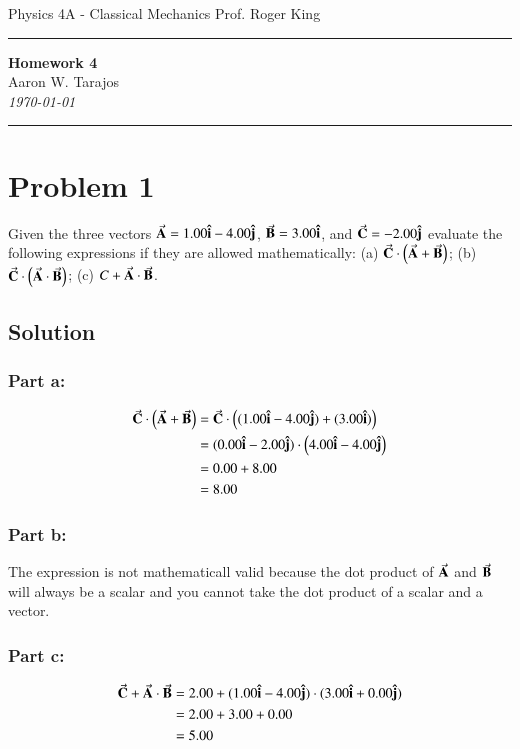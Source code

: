 \documentclass{article}
\begin{document}
\noindent
Physics 4A - Classical Mechanics \hfill Prof. Roger King

\noindent\rule{\textwidth}{0.4pt}

\begin{center}
    \textbf{\LARGE Homework 4} \\
    \vspace{12pt}
    \large Aaron W. Tarajos \\
    \textit{\today}
\end{center}

\noindent\rule{\textwidth}{0.4pt}

\section*{Problem 1}
Given the three vectors $\va A = 1.00 \vu i  -4.00 \vu j$, $\va B = 3.00 \vu i$, and $\va C = -2.00 \vu j$ evaluate the following expressions if they are allowed mathematically: (a) $\va C \cdot \left( \va A + \va B \right)$; (b) $\va C \cdot \left( \va A \cdot \va B \right)$; (c) $C + \va A \cdot \va B$.

\subsection*{Solution}
\subsubsection*{Part a:}
\begin{align*}
	\va C \cdot \left( \va A + \va B \right) &= \va C \cdot \left((1.00 \vu i  -4.00 \vu j) + (3.00 \vu i)\right) \\
	&= (0.00 \vu i -2.00 \vu j) \cdot \left( 4.00 \vu i -4.00 \vu j\right) \\
	&= 0.00 + 8.00 \\
	&= 8.00
\end{align*}

\subsubsection*{Part b:}
The expression is not mathematicall valid because the dot product of $\va A$ and $\va B$ will always be a scalar and you cannot take the dot product of a scalar and a vector.

\subsubsection*{Part c:}
\begin{align*}
	\va C + \va A \cdot \va B &= 2.00 + (1.00 \vu i  -4.00 \vu j) \cdot (3.00 \vu i + 0.00 \vu j) \\
				  &= 2.00 + 3.00 + 0.00 \\
				  &= 5.00
\end{align*}
\end{document}
